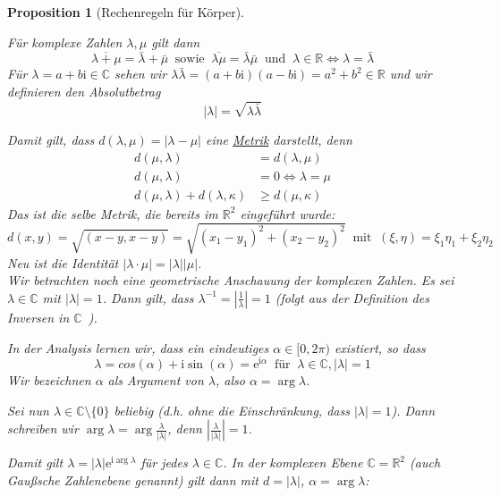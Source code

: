 \documentclass{report}
\newcommand{\lb}{\lambda}
\newcommand{\ii}{\mathrm{i}}
\newcommand{\ee}{\mathrm{e}}
\newcommand{\R}{\mathbb{R}}
\newcommand{\C}{\mathbb{C}}
\newcommand{\mC}{$\mathbb{C}$\ }
\newcommand{\al}{\alpha}
\theoremstyle{customrem}
\theoremstyle{customdef}
\newtheorem{prop}[definition]{Proposition}
\begin{document}
\begin{prop}[Rechenregeln für Körper]
\begin{enumerate}
				Für komplexe Zahlen $\lb, \mu$ gilt dann $$\overline{\lb + \mu} = \bar{\lb} + \bar{\mu}\ \text{ sowie }\ \overline{\lb \mu} = \bar{\lb}\bar{\mu}\ \text{ und }\ \lb \in \R \Leftrightarrow \lb = \bar{\lb}$$
				Für $\lb = a+ b\ii \in \C$ sehen wir $\lb \bar{\lb} = (a + b\ii) (a - b\ii) = a^2 + b^2 \in \R$ und wir definieren den Absolutbetrag $$|\lb| = \sqrt{\lb \bar{\lb}}$$
				
				Damit gilt, dass $d(\lb, \mu) = |\lb - \mu|$ eine \hyperref[metrikkor]{Metrik} darstellt, denn
				\begin{align*}
					d(\mu, \lb) &= d(\lb, \mu)\\
					d(\mu, \lb) &= 0 \Leftrightarrow \lb = \mu\\
					d(\mu, \lb) + d(\lb, \kappa) &\ge d(\mu, \kappa)
				\end{align*}
				Das ist die selbe Metrik, die bereits im $\R^2$ eingeführt wurde:			
				$$d(x, y) = \sqrt{(x - y, x - y)} = \sqrt{(x_1-y_1)^2 + (x_2 - y_2)^2} \ \text{ mit }\ (\xi, \eta) = \xi_1 \eta_1 + \xi_2 \eta_2$$
				Neu ist die Identität $|\lb \cdot \mu| = |\lb| |\mu|$.\\
				
				Wir betrachten noch eine geometrische Anschauung der komplexen Zahlen. Es sei $\lb \in \C$ mit $|\lb| = 1$. Dann gilt, dass $\lb^{-1} = |\frac{1}{\lb}| = 1$  (folgt aus der Definition des Inversen in \mC).
				
				In der Analysis lernen wir, dass ein eindeutiges $\al \in [0, 2\pi)$ existiert, so dass $$\lb = cos(\al) + \ii \sin(\al) = \ee^{\ii\al}\ \text{ für }\ \lb \in \C, |\lb| = 1$$
				Wir bezeichnen $\al$ als Argument von $\lb$, also $\al = \arg \lb$.
				
				Sei nun $\lb \in \C \setminus \{0\}$ beliebig (d.h. ohne die Einschränkung, dass $|\lb| = 1$). Dann schreiben wir $\arg \lb = \arg \frac{\lb}{|\lb|}$, denn $\left|\frac{\lb}{|\lb|}\right|=1$.
				
				Damit gilt $\lb = |\lb| \ee^{\ii \arg \lb}$ für jedes $\lb \in \C$. In der komplexen Ebene $\C = \R^2$ (auch Gaußsche Zahlenebene genannt) gilt dann	mit $d = |\lb|$, $\al = \arg \lb$:
				

\end{enumerate}
\end{prop}
\end{document}
